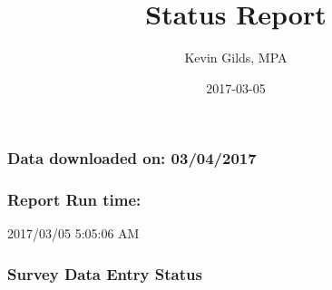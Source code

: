 \documentclass[]{article}
\title{Status Report}
\author{Kevin Gilds, MPA}
\date{2017-03-05}
\newenvironment{Shaded}{\begin{snugshade}}{\end{snugshade}}
\newcommand{\KeywordTok}[1]{\textcolor[rgb]{0.13,0.29,0.53}{\textbf{{#1}}}}
\newcommand{\StringTok}[1]{\textcolor[rgb]{0.31,0.60,0.02}{{#1}}}
\newcommand{\NormalTok}[1]{{#1}}
\begin{document}
\maketitle

\subsubsection{Data downloaded on:
03/04/2017}\label{data-downloaded-on-03042017}

\subsubsection{Report Run time:}\label{report-run-time}

2017/03/05 5:05:06 AM

\subsubsection{Survey Data Entry Status}\label{survey-data-entry-status}

\begin{Shaded}
\end{Shaded}
\end{document}
